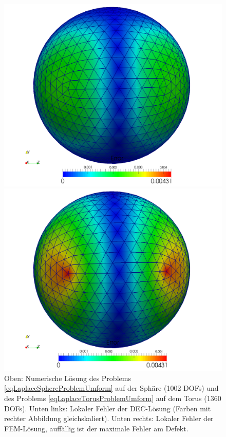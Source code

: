 \begin{figure}
      \begin{minipage}[t]{0.49\textwidth}
        \includegraphics[width=\textwidth]{bilder/laplaceSphere/DECError1k.png}
      \end{minipage}
      \hfill
      \begin{minipage}[t]{0.49\textwidth}
        \includegraphics[width=\textwidth]{bilder/laplaceSphere/FEMError1k.png}
      \end{minipage}
      \caption[Laplace auf Sphäre und Torus]{Oben: Numerische Lösung des Problems \eqref{eqLaplaceSphereProblemUmform} auf der Sphäre
                                             (1002 DOFs) 
                                             und des Problems \eqref{eqLaplaceTorusProblemUmform} auf dem Torus (1360 DOFs).
                                             Unten links: Lokaler Fehler der DEC-Lösung (Farben mit rechter Abbildung gleichskaliert).
                                             Unten rechts: Lokaler Fehler der FEM-Lösung, auffällig ist der maximale Fehler am Defekt.}
      \label{figLaplaceSphereTorus}
    \end{figure}

